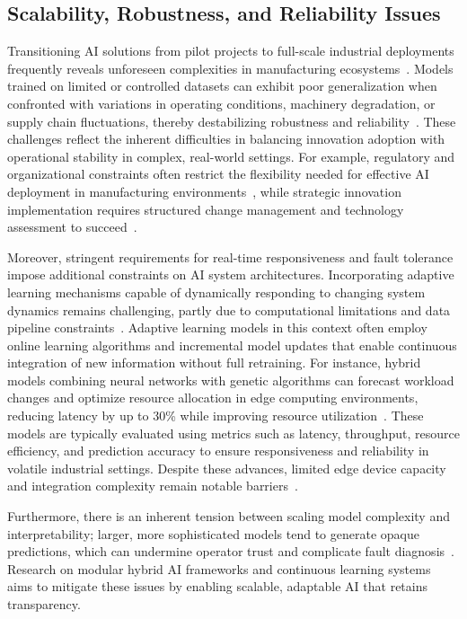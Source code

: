 \documentclass[sigconf]{acmart}
\begin{document}
\subsection{Scalability, Robustness, and Reliability Issues}

Transitioning AI solutions from pilot projects to full-scale industrial deployments frequently reveals unforeseen complexities in manufacturing ecosystems~\cite{ref16,ref19}. Models trained on limited or controlled datasets can exhibit poor generalization when confronted with variations in operating conditions, machinery degradation, or supply chain fluctuations, thereby destabilizing robustness and reliability~\cite{ref6,ref20}. These challenges reflect the inherent difficulties in balancing innovation adoption with operational stability in complex, real-world settings. For example, regulatory and organizational constraints often restrict the flexibility needed for effective AI deployment in manufacturing environments~\cite{ref16}, while strategic innovation implementation requires structured change management and technology assessment to succeed~\cite{ref19}.

Moreover, stringent requirements for real-time responsiveness and fault tolerance impose additional constraints on AI system architectures. Incorporating adaptive learning mechanisms capable of dynamically responding to changing system dynamics remains challenging, partly due to computational limitations and data pipeline constraints~\cite{ref31,ref32}. Adaptive learning models in this context often employ online learning algorithms and incremental model updates that enable continuous integration of new information without full retraining. For instance, hybrid models combining neural networks with genetic algorithms can forecast workload changes and optimize resource allocation in edge computing environments, reducing latency by up to 30\% while improving resource utilization~\cite{ref31}. These models are typically evaluated using metrics such as latency, throughput, resource efficiency, and prediction accuracy to ensure responsiveness and reliability in volatile industrial settings. Despite these advances, limited edge device capacity and integration complexity remain notable barriers~\cite{ref31,ref32}.

Furthermore, there is an inherent tension between scaling model complexity and interpretability; larger, more sophisticated models tend to generate opaque predictions, which can undermine operator trust and complicate fault diagnosis~\cite{ref2}. Research on modular hybrid AI frameworks and continuous learning systems aims to mitigate these issues by enabling scalable, adaptable AI that retains transparency. 
\end{document}
